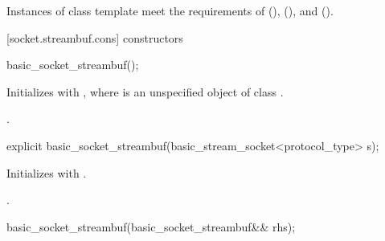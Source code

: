 \pnum
Instances of class template  meet the requirements of  (),  (), and  ().


[socket.streambuf.cons]{ constructors}

\begin{itemdecl}
basic_socket_streambuf();
\end{itemdecl}

\begin{itemdescr}
\pnum
\effects Initializes  with , where  is an unspecified object of class .

\pnum
\postconditions {}.
\end{itemdescr}

\begin{itemdecl}
explicit basic_socket_streambuf(basic_stream_socket<protocol_type> s);
\end{itemdecl}

\begin{itemdescr}
\pnum
\effects Initializes  with .

\pnum
\postconditions {}.
\end{itemdescr}

\begin{itemdecl}
basic_socket_streambuf(basic_socket_streambuf&& rhs);
\end{itemdecl}

